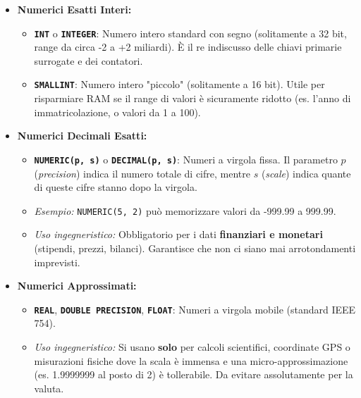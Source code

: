 \begin{itemize}
    \item \textbf{Numerici Esatti Interi:}
    \begin{itemize}
        \item \texttt{\textbf{INT}} o \texttt{\textbf{INTEGER}}: Numero intero standard con segno (solitamente a 32 bit, range da circa -2 a +2 miliardi). È il re indiscusso delle chiavi primarie surrogate e dei contatori.
        \item \texttt{\textbf{SMALLINT}}: Numero intero "piccolo" (solitamente a 16 bit). Utile per risparmiare RAM se il range di valori è sicuramente ridotto (es. l'anno di immatricolazione, o valori da 1 a 100).
    \end{itemize}
    
    \item \textbf{Numerici Decimali Esatti:}
    \begin{itemize}
        \item \texttt{\textbf{NUMERIC(p, s)}} o \texttt{\textbf{DECIMAL(p, s)}}: Numeri a virgola fissa. Il parametro $p$ (\textit{precision}) indica il numero totale di cifre, mentre $s$ (\textit{scale}) indica quante di queste cifre stanno dopo la virgola. 
        \item \textit{Esempio:} \texttt{NUMERIC(5, 2)} può memorizzare valori da -999.99 a 999.99.
        \item \textit{Uso ingegneristico:} Obbligatorio per i dati \textbf{finanziari e monetari} (stipendi, prezzi, bilanci). Garantisce che non ci siano mai arrotondamenti imprevisti.
    \end{itemize}
    
    \item \textbf{Numerici Approssimati:}
    \begin{itemize}
        \item \texttt{\textbf{REAL}}, \texttt{\textbf{DOUBLE PRECISION}}, \texttt{\textbf{FLOAT}}: Numeri a virgola mobile (standard IEEE 754).
        \item \textit{Uso ingegneristico:} Si usano \textbf{solo} per calcoli scientifici, coordinate GPS o misurazioni fisiche dove la scala è immensa e una micro-approssimazione (es. 1.9999999 al posto di 2) è tollerabile. Da evitare assolutamente per la valuta.
    \end{itemize}
\end{itemize}

